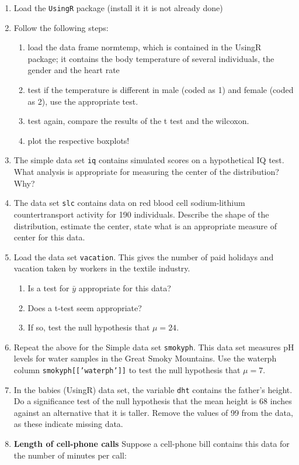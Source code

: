 \documentclass[11pt]{article}
\begin{document}
  \begin{enumerate}
  \item Load the \texttt{UsingR} package (install it it is not already done)
  \item Follow the following steps:
    \begin{enumerate}
    \item load the data frame normtemp, which is contained in the UsingR package; it contains the body temperature of several individuals, the gender and the heart rate
    \item test if the temperature is different in male (coded as 1) and female (coded as 2), use the appropriate test.
    \item test again, compare the results of the t test and the wilcoxon.
    \item plot the respective boxplots!
    \end{enumerate}
  \item The simple data set \texttt{iq} contains simulated scores on a hypothetical IQ test. What analysis is appropriate for measuring the center of the distribution? Why?
  \item The data set \texttt{slc} contains data on red blood cell sodium-lithium countertransport activity for 190 individuals. Describe the shape of the distribution, estimate the center, state what is an appropriate measure of center for this data.
  \item  Load the data set \texttt{vacation}. This gives the number of paid holidays and vacation taken by workers in the textile industry.
    \begin{enumerate}
    \item Is a test for $\bar{y}$ appropriate for this data?
    \item Does a t-test seem appropriate?
    \item If so, test the null hypothesis that $\mu = 24$. 
    \end{enumerate}
  \item  Repeat the above for the Simple data set \texttt{smokyph}. This data set measures pH levels for water samples in the Great Smoky Mountains. Use the waterph column \texttt{smokyph[[’waterph’]]} to test the null hypothesis that
    $\mu = 7$.
  \item In the babies (UsingR) data set, the variable \texttt{dht} contains the father’s height. Do a significance test of the null hypothesis that  the mean height is 68 inches against an alternative that it is taller. Remove the values of 99 from the data, as these indicate missing data.
  \item \textbf{Length of cell-phone calls} Suppose a cell-phone bill contains this data for the number of minutes per call: 


\end{enumerate}
\end{document}
